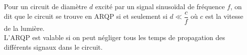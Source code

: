 \documentclass[a4paper]{article}
\begin{document}
\pagestyle{fancy}
\fancyhf{}
\setlength{\headheight}{15pt}

\begin{center}
	\large{}
\end{center}


Pour un circuit de diamètre \(d\) excité par un signal sinusoïdal de fréquence \(f\), on dit que le circuit se trouve en ARQP si et seulement si \(d \ll \dfrac{c}{f}\) où \(c\) est la vitesse de la lumière.\\
L’ARQP est valable si on peut négliger tous les temps de propagation des différents signaux dans le circuit.
\end{document}
